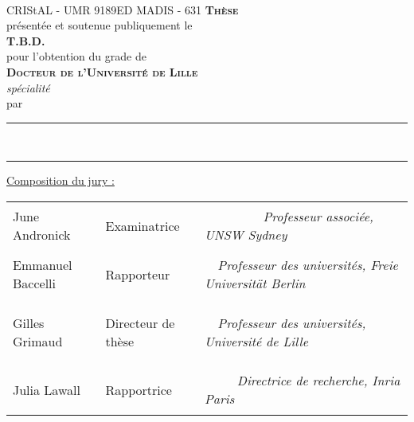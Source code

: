 \begin{titlepage}
    \sffamily
    \begin{center}
	{
        	\def\svgwidth{20 em}
		\\
		{\tiny{CRIStAL - UMR 9189}\hfil{ED MADIS - 631}}
	}
        \vfil
	{
		{
			{\Huge{\textsc{\textbf{Thèse}}}}
		}\\[1 em]
		{
			{présentée et soutenue publiquement le}\\
			{\textbf{T.B.D.}}
		}\\[1 em]
		{
			{pour l'obtention du grade de}\\
			{\LARGE{\textsc{\textbf{Docteur de l'Université de Lille}}}}\\
			{\large\textit{spécialité \printProgram}}
		}\\[1 em]
		{
			{par}\\[0.3 em]
			{\Large\textbf{\printAuthor}}
		}
	}
        \vfil
        {\LARGE
            \rule[1 ex]{\textwidth}{1.5 pt}
            \onehalfspacing\printTitleBold\\[1 ex]
            \rule[-1 ex]{\textwidth}{1.5 pt}
        }
    \end{center}
    
    \vfil
	{\small \centering \underline{Composition du jury :}}
    \begin{table}[h]
	\small
        \sffamily 
        {%
	    \begin{tabular}{
		>{\raggedright\arraybackslash}p{}
		>{\bfseries\raggedright\arraybackslash}p{}%
		>{\itshape\raggedleft\arraybackslash}p{}
	    }
		June Andronick		& Examinatrice		& ~~~~~~~~~Professeur associée, UNSW Sydney\\
		Emmanuel Baccelli	& Rapporteur		& ~~Professeur des universités, Freie Universität Berlin\\
		Gilles Grimaud		& Directeur de thèse	& ~~Professeur des universités, Université de Lille\\
		Julia Lawall		& Rapportrice		& ~~~~~Directrice de recherche, Inria Paris\\
            \end{tabular}
        }
    \end{table}
\end{titlepage}

\restoregeometry
